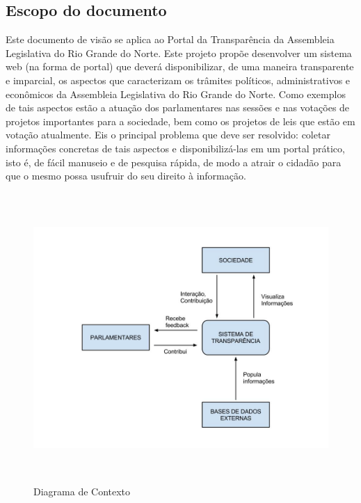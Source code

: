 \documentclass[12pt, a4paper]{article}
\begin{document}
        \subsection{Escopo do documento}
        Este documento de visão se aplica ao Portal da Transparência da
        Assembleia Legislativa do Rio Grande do Norte. Este projeto propõe
        desenvolver um sistema web (na forma de portal) que deverá
        disponibilizar, de uma maneira transparente e imparcial, os aspectos
        que caracterizam os trâmites políticos, administrativos e econômicos da
        Assembleia Legislativa do Rio Grande do Norte.  Como exemplos de tais
        aspectos estão a atuação dos parlamentares nas sessões e nas votações
        de projetos importantes para a sociedade, bem como os projetos de leis
        que estão em votação atualmente. Eis o principal problema que deve ser
        resolvido: coletar informações concretas de tais aspectos e
        disponibilizá-las em um portal prático, isto é, de fácil manuseio e de
        pesquisa rápida, de modo a atrair o cidadão para que o mesmo possa
        usufruir do seu direito à informação.

        \begin{figure}[h]
            \centering
            \includegraphics[width=15cm,height=11cm]{final.jpg}
            \caption{Diagrama de Contexto}
            \label{fig:mesh1}
        \end{figure}
        
\end{document}
